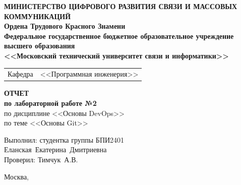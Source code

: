 \thispagestyle{empty}

\begin{center}
	\textbf{МИНИСТЕРСТВО ЦИФРОВОГО РАЗВИТИЯ СВЯЗИ И МАССОВЫХ КОММУНИКАЦИЙ} \\
	\textbf{Ордена Трудового Красного Знамени \\
	Федеральное государственное бюджетное образовательное учреждение высшего образования \\
	<<Московский технический университет связи и информатики>>}
\end{center}

\vspace{0.3em}

\begin{center}
	\begin{tabularx}{0.5\textwidth}{p{1.2cm}X}
		Кафедра & \quad <<Программная инженерия>> \\%
	\end{tabularx}
\end{center}

\vspace{12em}

\begin{center}
	\Large
	\textbf{ОТЧЕТ} \\
	\textbf{по лабораторной работе №2} \\
	\large
	по дисциплине <<Основы DevOps>> \\
	по теме <<Основы Git>>
\end{center}


\vspace{3em}

\begin{flushright}
	Выполнил: 
	студентка группы БПИ2401 \\
	Еланская~Екатерина~Дмитриевна\\
	Проверил: Тимчук~А.В.\\
\end{flushright}

\vspace{8em}

\begin{center}
	Москва,~\the\year
\end{center}
\clearpage

